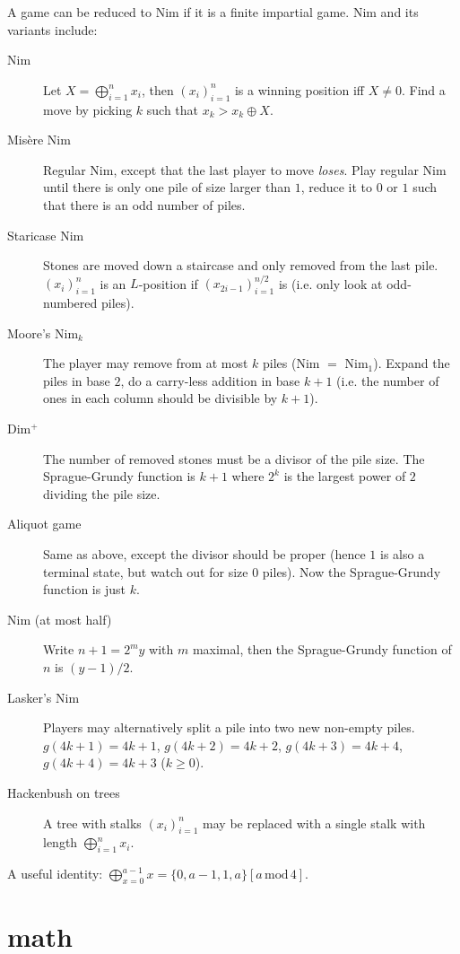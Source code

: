 \documentclass[8pt,a4paper,landscape,oneside]{amsart}
\begin{document}
\begin{multicols*}{3}
A game can be reduced to Nim if it is a finite impartial game. Nim and its variants include:
\begin{description}
	\item[Nim] Let $X = \bigoplus_{i=1}^n x_i$, then $(x_i)_{i=1}^n$ is a winning position iff $X\neq 0$. Find a move by picking $k$ such that $x_k > x_k \oplus X$.
	\item[Mis\`{e}re Nim] Regular Nim, except that the last player to move \textit{loses}. Play regular Nim until there is only one pile of size larger than $1$, reduce it to $0$ or $1$ such that there is an odd number of piles.
	\item[Staricase Nim] Stones are moved down a staircase and only removed from the last pile. $(x_i)_{i=1}^n$ is an $L$-position if $(x_{2i-1})_{i=1}^{n/2}$ is (i.e. only look at odd-numbered piles).
	\item[Moore's Nim$_k$] The player may remove from at most $k$ piles (Nim $=$ Nim$_1$). Expand the piles in base $2$, do a carry-less addition in base $k+1$ (i.e. the number of ones in each column should be divisible by $k+1$).
	\item[Dim$^+$] The number of removed stones must be a divisor of the pile size. The Sprague-Grundy function is $k+1$ where $2^k$ is the largest power of $2$ dividing the pile size.
	\item[Aliquot game] Same as above, except the divisor should be proper (hence $1$ is also a terminal state, but watch out for size $0$ piles). Now the Sprague-Grundy function is just $k$.
	\item[Nim (at most half)] Write $n+1 = 2^my$ with $m$ maximal, then the Sprague-Grundy function of $n$ is $(y - 1) / 2$.
	\item[Lasker's Nim] Players may alternatively split a pile into two new non-empty piles. $g(4k+1) = 4k+1$, $g(4k+2) = 4k+2$, $g(4k+3) = 4k+4$, $g(4k+4) = 4k+3$ ($k\geq 0$).
	\item[Hackenbush on trees] A tree with stalks $(x_i)_{i=1}^n$ may be replaced with a single stalk with length $\bigoplus_{i=1}^n x_i$.
\end{description}

A useful identity: $\bigoplus_{x=0}^{a - 1} x = \{0, a - 1, 1, a\}[a \, \mathrm{mod} \, 4]$.

\section{math}


\end{multicols*}
\end{document}
